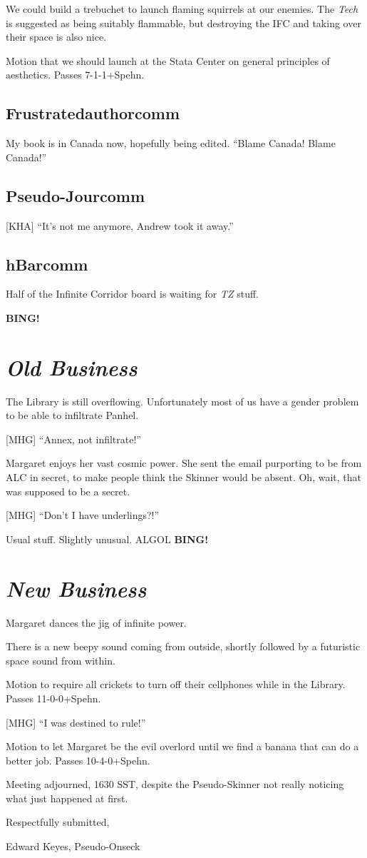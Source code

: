 \documentclass[10pt]{article}
\newcommand{\bing}{{\bf BING!} }
\newcommand{\goto}[1]{\bing \vskip 12pt \section*{{\em{#1}}}}
\begin{document}
We could build a trebuchet to launch flaming squirrels at our enemies.
The {\em Tech} is suggested as being suitably flammable, but destroying
the IFC and taking over their space is also nice.

Motion that we should launch at the Stata Center on general principles
of aesthetics.  Passes \hbox{7-1-1+Spehn}.

\subsection*{Frustratedauthorcomm}

My book is in Canada now, hopefully being edited.  ``Blame Canada!
Blame Canada!''

\subsection*{Pseudo-Jourcomm}

[KHA] ``It's not me anymore, Andrew took it away.''

\subsection*{hBarcomm}

Half of the Infinite Corridor board is waiting for {\em TZ} stuff.

\goto{Old Business}

The Library is still overflowing.  Unfortunately most of us have a
gender problem to be able to infiltrate Panhel.

[MHG] ``Annex, not infiltrate!''

Margaret enjoys her vast cosmic power.  She sent the email purporting
to be from ALC in secret, to make people think the Skinner would be
absent.  Oh, wait, that was supposed to be a secret.

[MHG] ``Don't I have underlings?!''

Usual stuff.  Slightly unusual.  ALGOL
\goto{New Business}

Margaret dances the jig of infinite power.

There is a new beepy sound coming from outside, shortly followed by a
futuristic space sound from within.

Motion to require all crickets to turn off their cellphones while in
the Library.  Passes \hbox{11-0-0+Spehn}.

[MHG] ``I was destined to rule!''

Motion to let Margaret be the evil overlord until we find a banana that
can do a better job.  Passes \hbox{10-4-0+Spehn}.

\vspace{12pt}

\noindent
Meeting adjourned, 1630 SST, despite the Pseudo-Skinner not really
noticing what just happened at first.

\vspace{18pt}

\centerline{Respectfully submitted,}
\centerline{Edward Keyes, Pseudo-Onseck}
\end{document}
